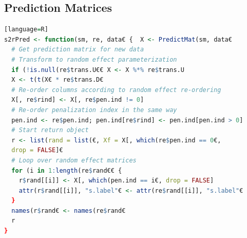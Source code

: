 \documentclass[12pt, twoside,hidelinks]{article}
\theoremstyle{definition}
\numberwithin{equation}{section}
\begin{document}
\subsection{Prediction Matrices}

\begin{lstlisting}[language=R][language=R]
s2rPred <- function(sm, re, data€ {  X <- PredictMat(sm, data€   
  # Get prediction matrix for new data
  # Transform to random effect parameterization
  if (!is.null(re$trans.U€€ X <- X %*% re$trans.U
  X <- t(t(X€ * re$trans.D€
  # Re-order columns according to random effect re-ordering
  X[, re$rind] <- X[, re$pen.ind != 0] 
  # Re-order penalization index in the same way  
  pen.ind <- re$pen.ind; pen.ind[re$rind] <- pen.ind[pen.ind > 0]
  # Start return object
  r <- list(rand = list(€, Xf = X[, which(re$pen.ind == 0€, 
  drop = FALSE]€
  # Loop over random effect matrices
  for (i in 1:length(re$rand€€ { 
    r$rand[[i]] <- X[, which(pen.ind == i€, drop = FALSE]
    attr(r$rand[[i]], "s.label"€ <- attr(re$rand[[i]], "s.label"€
  }
  names(r$rand€ <- names(re$rand€
  r
}
\end{lstlisting}


\newpage




\end{document}
